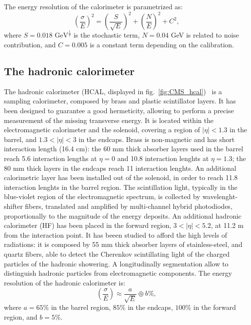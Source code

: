 \noindent The energy resolution of the calorimeter is parametrized as:
\begin{equation}
{\left( \frac{\sigma}{E} \right)}^2 = {\left( \frac{S}{\sqrt{E}} \right)}^2 + {\left( \frac{N}{E} \right)}^2 + C^2,
\end{equation}
where $S=0.018 \text{ GeV}^{\frac{1}{2}}$ is the stochastic term, $N=0.04$ GeV is related to noise contribution, and $C=0.005$ is a constant term depending on the calibration.


\subsection{The hadronic calorimeter}
The hadronic calorimeter (HCAL, displayed in fig.~\ref{fig:CMS_hcal})~\cite{HCAL-TDR} is a sampling calorimeter, composed by brass and plastic scintillator layers. It has been designed to guarantee a good hermeticity, allowing to perform a precise measurement of the missing transverse energy. It is located within the electromagnetic calorimeter and the solenoid, covering a region of $|\eta|<1.3$ in the barrel, and $1.3<|\eta|<3$ in the endcaps. Brass is non-magnetic and has short interaction length (16.4 cm): the 60 mm thick absorber layers used in the barrel reach 5.6 interaction lengths at $\eta=0$ and 10.8 interaction lenghts at $\eta = 1.3$; the 80 mm thick layers in the endcaps reach 11 interaction lenghts. An additional calorimetric layer has been installed out of the solenoid, in order to reach 11.8 interaction lenghts in the barrel region. The scintillation light, typically in the blue-violet region of the electromagnetic spectrum, is collected by wavelenght-shifter fibers, translated and amplified by multi-channel hybrid photodiodes, proportionally to the magnitude of the energy deposits. An additional hadronic calorimeter (HF) has been placed in the forward region, $3 < |\eta| < 5.2$, at 11.2 m from the interaction point. It has beeen studied to afford the high levels of radiations: it is composed by 55 mm thick absorber layers of stainless-steel, and quartz fibers, able to detect the Cherenkov scintillating light of the charged particles of the hadronic showering. A longitudinally segmentation allow to distinguish hadronic particles from electromagnetic components.
The energy resolution of the hadronic calorimeter is:
\begin{equation}
\left( \frac{\sigma}{E} \right) \approx \frac{a}{\sqrt{E}} \oplus b\%,
\end{equation}
where $a=65\%$ in the barrel region, $85\%$ in the endcaps, $100\%$ in the forward region, and $b=5\%$.

